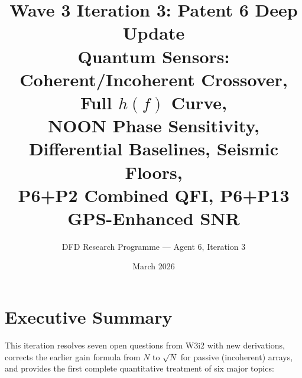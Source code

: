 \documentclass[11pt]{article}
\title{\textbf{Wave 3 Iteration 3: Patent 6 Deep Update}\\[6pt]
Quantum Sensors: Coherent/Incoherent Crossover, Full $h(f)$ Curve,\\
NOON Phase Sensitivity, Differential Baselines, Seismic Floors,\\
P6+P2 Combined QFI, P6+P13 GPS-Enhanced SNR}
\author{DFD Research Programme --- Agent 6, Iteration 3}
\date{March 2026}
\theoremstyle{definition}
\theoremstyle{remark}
\begin{document}
\maketitle
\tableofcontents
\newpage

\section*{Executive Summary}

This iteration resolves seven open questions from W3i2 with new derivations,
corrects the earlier gain formula from $N$ to $\sqrt{N}$ for passive (incoherent)
arrays, and provides the first complete quantitative treatment of six major
topics:
\end{document}
